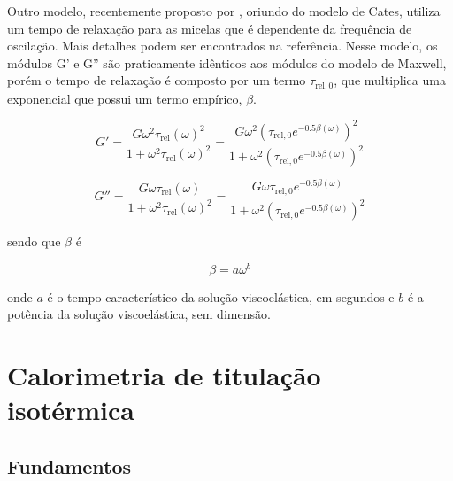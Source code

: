 			Outro modelo, recentemente proposto por %
			, oriundo do modelo de Cates, utiliza um tempo de relaxação para as micelas que é dependente da frequência de oscilação. Mais detalhes podem ser encontrados na referência. Nesse modelo, os módulos G' e G'' são praticamente idênticos aos módulos do modelo de Maxwell, porém o tempo de relaxação é composto por um termo \(\tau_{\textrm{rel}, 0}\), que multiplica uma exponencial que possui um termo empírico, \(\beta\). 
			
			\begin{equation}
			G' = \dfrac{ G \omega^2 \tau_{\textrm{rel}}(\omega)^2   }{  1 + \omega^2 \tau_{\textrm{rel}}(\omega)^2  } = %
				 \dfrac{ G \omega^2 \left(  \tau_{\textrm{rel}, 0} e^{-0.5\beta(\omega)}  \right)^2   }{  1 + \omega^2 \left(  \tau_{\textrm{rel}, 0} e^{-0.5\beta(\omega)}  \right)^2  }
			\label{eqn:garcia_saraji_g1}
			\end{equation}
			
			\begin{equation}
			G'' = \dfrac{ G \omega \tau_{\textrm{rel}}(\omega)   }{  1 + \omega^2 \tau_{\textrm{rel}}(\omega)^2  } = %
			      \dfrac{ G \omega \tau_{\textrm{rel}, 0} e^{-0.5\beta(\omega)}   }{  1 + \omega^2 \left(  \tau_{\textrm{rel}, 0} e^{-0.5\beta(\omega)}  \right)^2  }
			\label{eqn:garcia_saraji_g2}
			\end{equation}
			
			sendo que \(\beta\) é
			
			\begin{equation}
				\beta = a \omega^b
			\end{equation}
			
			\noindent onde \(a\) é o tempo característico da solução viscoelástica, em segundos e \(b\) é a potência da solução viscoelástica, sem dimensão.
			
	\chapter{Calorimetria de titulação isotérmica}  
	
		\section{Fundamentos} 
		
		
